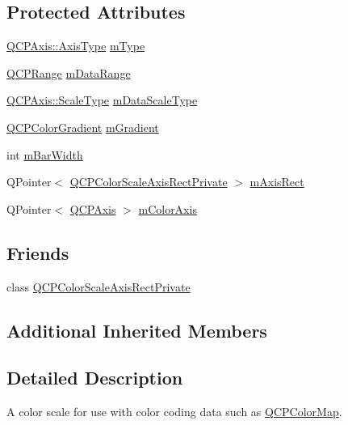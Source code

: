 \subsection*{Protected Attributes}
\begin{DoxyCompactItemize}
\item 
\mbox{\hyperlink{class_q_c_p_axis_ae2bcc1728b382f10f064612b368bc18a}{Q\+C\+P\+Axis\+::\+Axis\+Type}} \mbox{\hyperlink{class_q_c_p_color_scale_a7d47ed4ab76f38e50164e9d77fe33789}{m\+Type}}
\item 
\mbox{\hyperlink{class_q_c_p_range}{Q\+C\+P\+Range}} \mbox{\hyperlink{class_q_c_p_color_scale_a5d4853feb32cd0077bb2b871687c844b}{m\+Data\+Range}}
\item 
\mbox{\hyperlink{class_q_c_p_axis_a36d8e8658dbaa179bf2aeb973db2d6f0}{Q\+C\+P\+Axis\+::\+Scale\+Type}} \mbox{\hyperlink{class_q_c_p_color_scale_a2754d6a78736f64a241e333fbd955372}{m\+Data\+Scale\+Type}}
\item 
\mbox{\hyperlink{class_q_c_p_color_gradient}{Q\+C\+P\+Color\+Gradient}} \mbox{\hyperlink{class_q_c_p_color_scale_ae195a385032066b5c46cc3301af58922}{m\+Gradient}}
\item 
int \mbox{\hyperlink{class_q_c_p_color_scale_a409d2ab78dff1f92da5e6acfb062e811}{m\+Bar\+Width}}
\item 
Q\+Pointer$<$ \mbox{\hyperlink{class_q_c_p_color_scale_axis_rect_private}{Q\+C\+P\+Color\+Scale\+Axis\+Rect\+Private}} $>$ \mbox{\hyperlink{class_q_c_p_color_scale_a6e37f7d49cd614dc50ef1caae60461b9}{m\+Axis\+Rect}}
\item 
Q\+Pointer$<$ \mbox{\hyperlink{class_q_c_p_axis}{Q\+C\+P\+Axis}} $>$ \mbox{\hyperlink{class_q_c_p_color_scale_a2efbc90fd31898fe05d2b74a8422b1d5}{m\+Color\+Axis}}
\end{DoxyCompactItemize}
\subsection*{Friends}
\begin{DoxyCompactItemize}
\item 
class \mbox{\hyperlink{class_q_c_p_color_scale_a1441d8c09d7227c0c29a8d0a96d55bfe}{Q\+C\+P\+Color\+Scale\+Axis\+Rect\+Private}}
\end{DoxyCompactItemize}
\subsection*{Additional Inherited Members}


\subsection{Detailed Description}
A color scale for use with color coding data such as \mbox{\hyperlink{class_q_c_p_color_map}{Q\+C\+P\+Color\+Map}}. 

